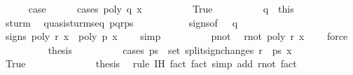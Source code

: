 \begin{isabellebody}
\ \ \ \ \isamarkupfalse%
\ {\isacharquery}case\isanewline
\ \ \ \ \isamarkupfalse%
\ {\isacharparenleft}cases\ {\isachardoublequoteopen}poly\ q\ x\ {\isacharequal}\ {}{\isachardoublequoteclose}{\isacharparenright}\isanewline
\ \ \ \ \ \ \isamarkupfalse%
\ True\isanewline
\ \ \ \ \ \ \ \ \isamarkupfalse%
\ q{\isacharunderscore}{}\ {\isacharequal}\ this\isanewline
\ \ \ \ \ \ \ \ \isamarkupfalse%
\ sturm\ \isamarkupfalse%
\ quasi{\isacharunderscore}sturm{\isacharunderscore}seq\ {\isachardoublequoteopen}p{\isacharhash}q{\isacharhash}r{\isacharhash}ps{\isacharprime}{\isacharprime}{\isachardoublequoteclose}\ \isacommand{{\isachardot}}\isamarkupfalse%
\isanewline
\ \ \ \ \ \ \ \ \isamarkupfalse%
\ signs{\isacharbrackleft}of\ {}{\isacharbrackright}\ \ q{\isacharunderscore}{}\ \isanewline
\ \ \ \ \ \ \ \ \ \ \ \ \isamarkupfalse%
\ signs{\isacharprime}{\isacharcolon}\ {\isachardoublequoteopen}poly\ r\ x\ {\isacharasterisk}\ poly\ p\ x\ {\isacharless}\ {}{\isachardoublequoteclose}\ \isamarkupfalse%
\ simp\isanewline
\ \ \ \ \ \ \ \ \isamarkupfalse%
\ p{\isacharunderscore}not{\isacharunderscore}{}\ \isamarkupfalse%
\ r{\isacharunderscore}not{\isacharunderscore}{}{\isacharcolon}\ {\isachardoublequoteopen}poly\ r\ x\ {\isasymnoteq}\ {}{\isachardoublequoteclose}\ \isamarkupfalse%
\ force\isanewline
\ \ \ \ \ \ \ \ \isamarkupfalse%
\ {\isacharquery}thesis\isanewline
\ \ \ \ \ \ \ \ \isamarkupfalse%
\ {\isacharparenleft}cases\ {\isachardoublequoteopen}ps{\isacharprime}\ {\isasymin}\ set\ {\isacharparenleft}split{\isacharunderscore}sign{\isacharunderscore}changes\ {\isacharparenleft}r\ {\isacharhash}\ ps{\isacharprime}{\isacharprime}{\isacharparenright}\ x\isanewline
\ \ \ \ \ \ \ \ \ \ \isamarkupfalse%
\ True\isanewline
\ \ \ \ \ \ \ \ \ \ \ \ \isamarkupfalse%
\ {\isacharquery}thesis\ \isamarkupfalse%
\ {\isacharparenleft}rule\ IH{\isacharparenleft}{}{\isacharparenright}{\isacharcomma}\ fact{\isacharcomma}\ fact{\isacharcomma}\ simp\ add{\isacharcolon}\ r{\isacharunderscore}not{\isacharunderscore}{}{\isacharcomma}\ fact{\isacharparenright}\isanewline

\end{isabellebody}
